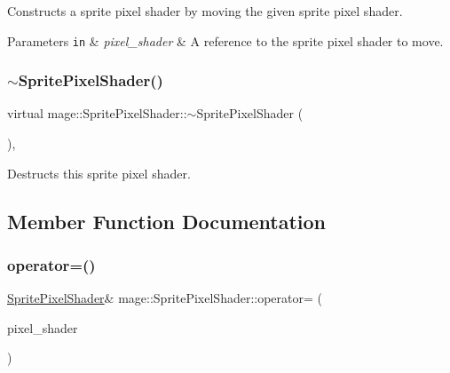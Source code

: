 Constructs a sprite pixel shader by moving the given sprite pixel shader.


\begin{DoxyParams}[1]{Parameters}
\mbox{\tt in}  & {\em pixel\+\_\+shader} & A reference to the sprite pixel shader to move. \\
\hline
\end{DoxyParams}
\hypertarget{classmage_1_1_sprite_pixel_shader_af7d6fd20a491855f8dfd2aef5e6294c4}{}\label{classmage_1_1_sprite_pixel_shader_af7d6fd20a491855f8dfd2aef5e6294c4} 
\subsubsection{\texorpdfstring{$\sim$\+Sprite\+Pixel\+Shader()}{~SpritePixelShader()}}
{\footnotesize\ttfamily virtual mage\+::\+Sprite\+Pixel\+Shader\+::$\sim$\+Sprite\+Pixel\+Shader (\begin{DoxyParamCaption}{ }\end{DoxyParamCaption})\hspace{0.3cm}{\ttfamily [virtual]}, {\ttfamily [default]}}

Destructs this sprite pixel shader. 

\subsection{Member Function Documentation}
\hypertarget{classmage_1_1_sprite_pixel_shader_adf6e6f0872406b9df46cb87731ed1ae0}{}\label{classmage_1_1_sprite_pixel_shader_adf6e6f0872406b9df46cb87731ed1ae0} 
\subsubsection{\texorpdfstring{operator=()}{operator=()}\hspace{0.1cm}{\footnotesize\ttfamily [1/2]}}
{\footnotesize\ttfamily \hyperlink{classmage_1_1_sprite_pixel_shader}{Sprite\+Pixel\+Shader}\& mage\+::\+Sprite\+Pixel\+Shader\+::operator= (\begin{DoxyParamCaption}\item[{const \hyperlink{classmage_1_1_sprite_pixel_shader}{Sprite\+Pixel\+Shader} \&}]{pixel\+\_\+shader }\end{DoxyParamCaption})\hspace{0.3cm}{\ttfamily [delete]}}

